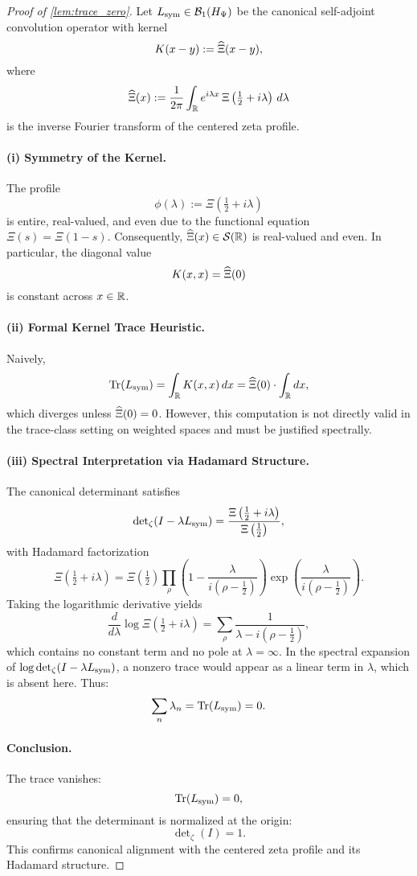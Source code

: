\begin{proof}[Proof of \cref{lem:trace_zero}]
Let \( L_{\mathrm{sym}} \in \mathcal{B}_1(H_{\Psi}) \) be the canonical self-adjoint convolution operator with kernel
\[
K(x - y) := \widehat{\Xi}(x - y),
\]
where
\[
\widehat{\Xi}(x) := \frac{1}{2\pi} \int_{\mathbb{R}} e^{i\lambda x} \, \Xi\left( \tfrac{1}{2} + i\lambda \right) \, d\lambda
\]
is the inverse Fourier transform of the centered zeta profile.

\paragraph{(i) Symmetry of the Kernel.}
The profile
\[
\phi(\lambda) := \Xi\left( \tfrac{1}{2} + i\lambda \right)
\]
is entire, real-valued, and even due to the functional equation \( \Xi(s) = \Xi(1 - s) \). Consequently, \( \widehat{\Xi}(x) \in \mathcal{S}(\mathbb{R}) \) is real-valued and even. In particular, the diagonal value
\[
K(x,x) = \widehat{\Xi}(0)
\]
is constant across \( x \in \mathbb{R} \).

\paragraph{(ii) Formal Kernel Trace Heuristic.}
Naively,
\[
\operatorname{Tr}(L_{\mathrm{sym}}) = \int_{\mathbb{R}} K(x,x) \, dx = \widehat{\Xi}(0) \cdot \int_{\mathbb{R}} dx,
\]
which diverges unless \( \widehat{\Xi}(0) = 0 \). However, this computation is not directly valid in the trace-class setting on weighted spaces and must be justified spectrally.

\paragraph{(iii) Spectral Interpretation via Hadamard Structure.}
The canonical determinant satisfies
\[
\det\nolimits_\zeta(I - \lambda L_{\mathrm{sym}}) = \frac{\Xi\left( \tfrac{1}{2} + i\lambda \right)}{\Xi\left( \tfrac{1}{2} \right)},
\]
with Hadamard factorization
\[
\Xi\left( \tfrac{1}{2} + i\lambda \right)
= \Xi\left( \tfrac{1}{2} \right)
\prod_\rho \left( 1 - \frac{\lambda}{i(\rho - \tfrac{1}{2})} \right)
\exp\left( \frac{\lambda}{i(\rho - \tfrac{1}{2})} \right).
\]
Taking the logarithmic derivative yields
\[
\frac{d}{d\lambda} \log \Xi\left( \tfrac{1}{2} + i\lambda \right)
= \sum_\rho \frac{1}{\lambda - i(\rho - \tfrac{1}{2})},
\]
which contains no constant term and no pole at \( \lambda = \infty \). In the spectral expansion of \( \log \det_\zeta(I - \lambda L_{\mathrm{sym}}) \), a nonzero trace would appear as a linear term in \( \lambda \), which is absent here. Thus:
\[
\sum_n \lambda_n = \operatorname{Tr}(L_{\mathrm{sym}}) = 0.
\]

\paragraph{Conclusion.}
The trace vanishes:
\[
\operatorname{Tr}(L_{\mathrm{sym}}) = 0,
\]
ensuring that the determinant is normalized at the origin:
\[
\det\nolimits_\zeta(I) = 1.
\]
This confirms canonical alignment with the centered zeta profile and its Hadamard structure.
\end{proof}
